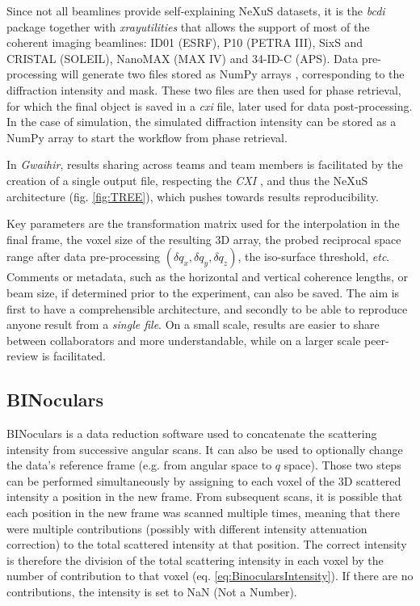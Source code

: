 Since not all beamlines provide self-explaining NeXuS datasets, it is the \textit{bcdi} package together with \textit{xrayutilities} \parencite{Kriegner2013} that allows the support of most of the coherent imaging beamlines: ID01 (ESRF), P10 (PETRA III), SixS and CRISTAL (SOLEIL), NanoMAX (MAX IV) and 34-ID-C (APS).
Data pre-processing will generate two files stored as NumPy arrays \parencite{VanDerWalt2011}, corresponding to the diffraction intensity and mask.
These two files are then used for phase retrieval, for which the final object is saved in a \textit{cxi} file, later used for data post-processing.
In the case of simulation, the simulated diffraction intensity can be stored as a NumPy array to start the workflow from phase retrieval.

In \textit{Gwaihir}, results sharing across teams and team members is facilitated by the creation of a single output file, respecting the \textit{CXI} \parencite{Maia2012}, and thus the NeXuS \parencite{Konnecke2015} architecture (fig. \ref{fig:TREE}), which pushes towards results reproducibility.

Key parameters are the transformation matrix used for the interpolation in the final frame, the voxel size of the resulting 3D array, the probed reciprocal space range after data pre-processing $(\delta q_x , \delta q_y , \delta q_z)$, the iso-surface threshold, \textit{etc}.
Comments or metadata, such as the horizontal and vertical coherence lengths, or beam size, if determined prior to the experiment, can also be saved.
The aim is first to have a comprehensible architecture, and secondly to be able to reproduce anyone result from a \textit{single file}.
On a small scale, results are easier to share between collaborators and more understandable, while on a larger scale peer-review is facilitated.

\subsection{BINoculars} \label{sec:BINoculars}

BINoculars \parencite{Roobol2015} is a data reduction software used to concatenate the scattering intensity from successive angular scans.
It can also be used to optionally change the data's reference frame (e.g. from angular space to $q$ space).
Those two steps can be performed simultaneously by assigning to each voxel of the 3D scattered intensity a position in the new frame.
From subsequent scans, it is possible that each position in the new frame was scanned multiple times, meaning that there were multiple contributions (possibly with different intensity attenuation correction) to the total scattered intensity at that position.
The correct intensity is therefore the division of the total scattering intensity in each voxel by the number of contribution to that voxel (eq. \ref{eq:BinocularsIntensity}).
If there are no contributions, the intensity is set to NaN (Not a Number).

